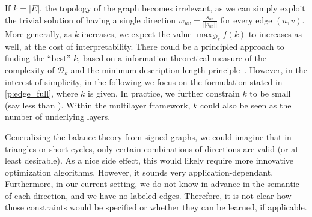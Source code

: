 \bigskip

If $k=|E|$, the topology of the graph becomes irrelevant, as we can simply exploit the trivial
solution of having a single direction $w_{uv} = \frac{s_{uv}}{||s_{uv}||}$ for every edge $(u,v)$.
More generally, as $k$ increases, we expect the value $\max_{\mathcal{D}_k} f(k)$ to increases as
well, at the cost of interpretability. There could be a principled approach to finding the
\enquote{best} $k$, based on a information theoretical measure of the complexity of $\mathcal{D}_k$
and the minimum description length principle~\autocite{grunwald2005tutorial}. However, in the
interest of simplicity, in the following we focus on the formulation stated in
\autoref{p:edge_full}, where $k$ is given. In practice, we further constrain $k$ to be small (say
less than ). Within the multilayer framework, $k$ could also be seen as the number of
underlying layers.

\begin{aside}
Generalizing the balance theory from signed graphs, we could imagine that in triangles or short
cycles, only certain combinations of directions are valid (or at least desirable). As a nice side
effect, this would likely require more innovative optimization algorithms. However, it sounds very
application-dependant. Furthermore, in our current setting, we do not know in advance in the
semantic of each direction, and we have no labeled edges. Therefore, it is not clear how those
constraints would be specified or whether they can be learned, if applicable. 
\end{aside}

